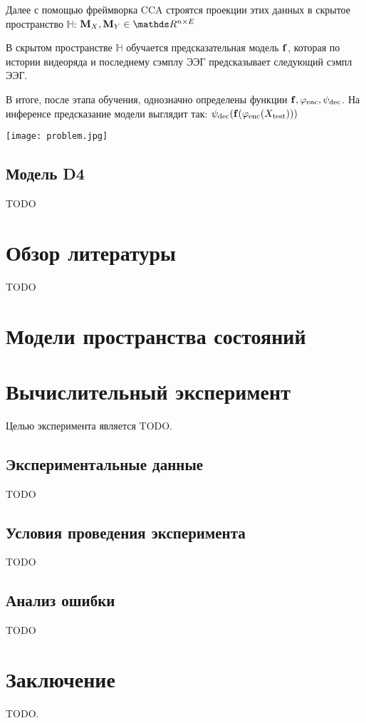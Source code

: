 \documentclass[a4paper, 12pt]{article}
\begin{document}
Далее с помощью фреймворка CCA строятся проекции этих данных в скрытое пространство $\mathds{H}$: $\bM_X, \bM_Y \in \dR^{n \times E}$

В скрытом пространстве $\mathds{H}$ обучается предсказательная модель $\mathbf{f}$, которая по истории видеоряда и последнему сэмплу ЭЭГ предсказывает следующий сэмпл ЭЭГ.

В итоге, после этапа обучения, однозначно определены функции $\mathbf{f}, \varphi_{\text{enc}}, \psi_{\text{dec}}$.
На инференсе предсказание модели выглядит так: $\psi_{\text{dec}}(\mathbf{f}(\varphi_{\text{enc}}(X_{\text{test}})))$

\texttt{[image: problem.jpg]}

\subsection{Модель D4}
TODO

\section{Обзор литературы}
TODO

\section{Модели пространства состояний}

\section{Вычислительный эксперимент}
Целью эксперимента является TODO.

\subsection{Экспериментальные данные}
TODO

\subsection{Условия проведения эксперимента}
TODO

\subsection{Анализ ошибки}
TODO


\section{Заключение}
TODO.



\end{document}
